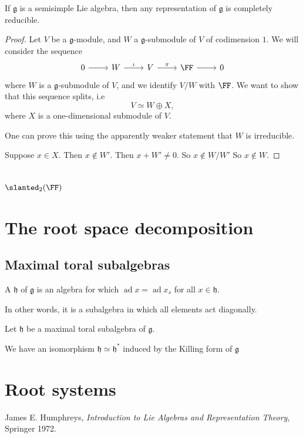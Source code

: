 \documentclass{article}
\newcommand*\ad{\operatorname{ad}}
\newcommand*\frkg{{\ensuremath{\mathfrak{g}}}}
\newcommand*\frkh{{\ensuremath{\mathfrak{h}}}}
\let\sl\slanted
\newcommand*\sl{\ensuremath{\mathfrak{sl}}}
\begin{document}
\begin{theorem}
    If $\frkg$ is a semisimple Lie algebra, then any representation of $\frkg$ is completely reducible.
\end{theorem}

\begin{proof}
    Let $V$ be a $\frkg$-module, and $W$ a $\frkg$-submodule of $V$ of codimension $1$.
    We will consider the sequence
    \[
        \begin{tikzcd}
            0 \arrow[r] & W \arrow[r, "\iota"] & V \arrow[r, "\pi"] & \FF \arrow[r] & 0
        \end{tikzcd}
    \]
    where $W$ is a $\frkg$-submodule of $V$, and we identify $V/W$ with $\FF$.
    We want to show that this sequence splits, i.e
    \[
        V 
        \simeq 
        W \oplus X,
    \]
    where $X$ is a one-dimensional submodule of $V$.

    One can prove this using the apparently weaker statement that $W$ is irreducible.

    Suppose $x \in X$.
    Then $x \notin W'$.
    Then $x + W' \neq 0$.
    So $x \notin W/W'$
    So $x \notin W$.
\end{proof}

\section{
\texorpdfstring{$\sl_2(\FF)$}{sl2(F)}
}

\section{The root space decomposition}

\subsection{Maximal toral subalgebras}

\begin{definition}
    A  $\frkh$ of $\frkg$ is an algebra for which $\ad x = \ad x_s$ for all $x \in \frkh$.
\end{definition}

In other words, it is a subalgebra in which all elements act diagonally.

\begin{proposition}
    Let $\frkh$ be a maximal toral subalgebra of $\frkg$.

    We have an isomorphism $\frkh \simeq \frkh^\ast$ induced by the Killing form of $\frkg$
\end{proposition}

\section{Root systems}

\begin{definition}
\end{definition}

\begin{thebibliography}{999999}
    \raggedright\footnotesize

    James E. Humphreys, \textit{Introduction to Lie Algebras and Representation Theory}, Springer 1972.

\end{thebibliography}
\end{document}
